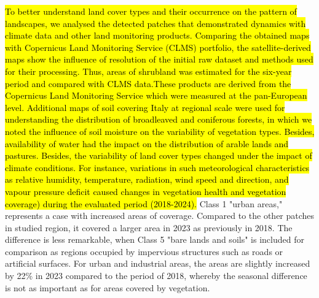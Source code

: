 \documentclass[jimaging,article,submit,pdftex,moreauthors]{Definitions/mdpi}
\begin{document}
\hl{To better understand land cover types and their occurrence on the pattern of landscapes, we analysed the detected patches that demonstrated dynamics with climate data and other land monitoring products. Comparing the obtained maps with Copernicus Land Monitoring Service (CLMS) portfolio, the satellite-derived maps show the influence of resolution of the initial raw dataset and methods used for their processing. Thus, areas of shrubland was  estimated for the six-year period and compared with CLMS data.These products are derived from the Copernicus Land Monitoring Service  which were measured at the pan-European level. Additional maps of soil covering Italy at regional scale were used for understanding the distribution of broadleaved and coniferous forests, in which we noted the influence of soil moisture on the variability of vegetation types. Besides, availability of water had the impact on the distribution of arable lands and pastures. Besides, the variability of land cover types changed under the impact of climate conditions. For instance, variations in such meteorological characteristics as relative humidity, temperature, radiation, wind speed and direction, and vapour pressure deficit caused changes in vegetation health and vegetation coverage) during the evaluated period (2018-2024). } Class 1 "urban areas," represents a case with increased areas of coverage. Compared to the other patches in studied region, it covered a larger area in 2023 as previously in 2018. The difference is less remarkable, when Class 5 "bare lands and soils" is included for comparison as regions occupied by impervious structures such as roads or artificial surfaces. For urban and industrial areas, the areas are slightly increased by 22\% in 2023 compared to the period of 2018, whereby the seasonal difference is not as important as for areas covered by vegetation. 
\end{document}
